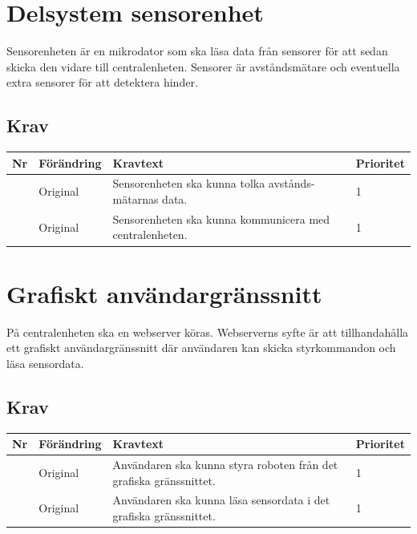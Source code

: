 \documentclass[a4paper,titlepage,12pt]{article}
\newcounter{reqNr}
\newcommand{\nextReqNr}{\stepcounter{reqNr}\arabic{reqNr}}
\begin{document}
	\section{Delsystem sensorenhet}
	Sensorenheten är en mikrodator som ska läsa data från sensorer för att sedan skicka 
	den vidare till centralenheten. Sensorer är avståndsmätare och eventuella extra sensorer 
	för att detektera hinder.

	\subsection{Krav}
	\begin{table}[h]
		\begin{tabularx}{\textwidth}{c l X l}
			\textbf{Nr} & \textbf{Förändring} & \textbf{Kravtext} & \textbf{Prioritet} 
				\\ \midrule

			\nextReqNr{} & Original & Sensorenheten ska kunna tolka avstånds- mätarnas data. & 1
				\\ \midrule

			\nextReqNr{} & Original & Sensorenheten ska kunna kommunicera med 
				centralenheten. & 1

		\end{tabularx}
	\end{table}

    \section{Grafiskt användargränssnitt}
    På centralenheten ska en webserver köras. Webserverns syfte är att
    tillhandahålla ett grafiskt användargränssnitt där användaren kan skicka
    styrkommandon och läsa sensordata.
	\subsection{Krav}
	\begin{table}[h]
      \begin{tabularx}{\textwidth}{c l X l}
        \textbf{Nr} & \textbf{Förändring} & \textbf{Kravtext} & \textbf{Prioritet} 
        \\ \midrule

        \nextReqNr{} & Original & Användaren ska kunna styra roboten från
                                  det grafiska gränssnittet. & 1
        \\ \midrule

        \nextReqNr{} & Original & Användaren ska kunna läsa sensordata i det
                                  grafiska gränssnittet. & 1

      \end{tabularx}
	\end{table}
\end{document}
